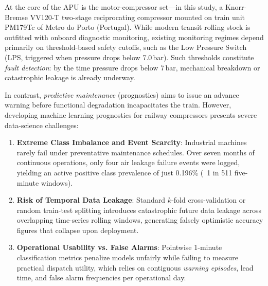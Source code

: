 \documentclass[10pt,twocolumn,a4paper]{article}
\begin{document}
At the core of the APU is the motor-compressor set---in this study, a Knorr-Bremse VV120-T two-stage reciprocating compressor mounted on train unit PM179Tc of Metro do Porto (Portugal). While modern transit rolling stock is outfitted with onboard diagnostic monitoring, existing monitoring regimes depend primarily on threshold-based safety cutoffs, such as the Low Pressure Switch (LPS, triggered when pressure drops below 7.0\,bar). Such thresholds constitute \textit{fault detection}: by the time pressure drops below 7\,bar, mechanical breakdown or catastrophic leakage is already underway. 

In contrast, \textit{predictive maintenance} (prognostics) aims to issue an advance warning before functional degradation incapacitates the train. However, developing machine learning prognostics for railway compressors presents severe data-science challenges:
\begin{enumerate}
    \item \textbf{Extreme Class Imbalance and Event Scarcity}: Industrial machines rarely fail under preventative maintenance schedules. Over seven months of continuous operations, only four air leakage failure events were logged, yielding an active positive class prevalence of just 0.196\% (~1 in 511 five-minute windows).
    \item \textbf{Risk of Temporal Data Leakage}: Standard $k$-fold cross-validation or random train-test splitting introduces catastrophic future data leakage across overlapping time-series rolling windows, generating falsely optimistic accuracy figures that collapse upon deployment.
    \item \textbf{Operational Usability vs. False Alarms}: Pointwise 1-minute classification metrics penalize models unfairly while failing to measure practical dispatch utility, which relies on contiguous \textit{warning episodes}, lead time, and false alarm frequencies per operational day.
\end{enumerate}
\end{document}
